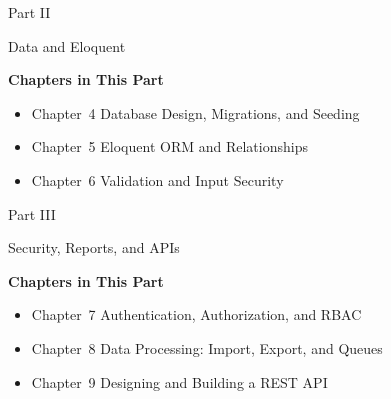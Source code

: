 \documentclass[
    paper=23cm:15.5cm,   %
    11pt,               %
    twoside,            %
    openany,            %
    bibliography=totoc, %
]{scrbook}            %
\begin{document}
\newpage
{}
\vspace*{4cm}
{\fontsize{28}{34}\sffamily\bfseries\raggedright Part II\par}
\vspace{6pt}
{\fontsize{22}{28}\sffamily\bfseries\raggedright Data and Eloquent\par}
\vspace{16pt}
{\large\sffamily\bfseries Chapters in This Part}\par
\vspace{6pt}
\begin{itemize}[topsep=0pt, itemsep=2pt]
  \item Chapter~4 \textbullet{} Database Design, Migrations, and Seeding
  \item Chapter~5 \textbullet{} Eloquent ORM and Relationships
  \item Chapter~6 \textbullet{} Validation and Input Security
\end{itemize}
\newpage







\newpage
{}
\vspace*{4cm}
{\fontsize{28}{34}\sffamily\bfseries\raggedright Part III\par}
\vspace{6pt}
{\fontsize{22}{28}\sffamily\bfseries\raggedright Security, Reports, and APIs\par}
\vspace{16pt}
{\large\sffamily\bfseries Chapters in This Part}\par
\vspace{6pt}
\begin{itemize}[topsep=0pt, itemsep=2pt]
  \item Chapter~7 \textbullet{} Authentication, Authorization, and RBAC
  \item Chapter~8 \textbullet{} Data Processing: Import, Export, and Queues
  \item Chapter~9 \textbullet{} Designing and Building a REST API
\end{itemize}
\newpage
\end{document}
